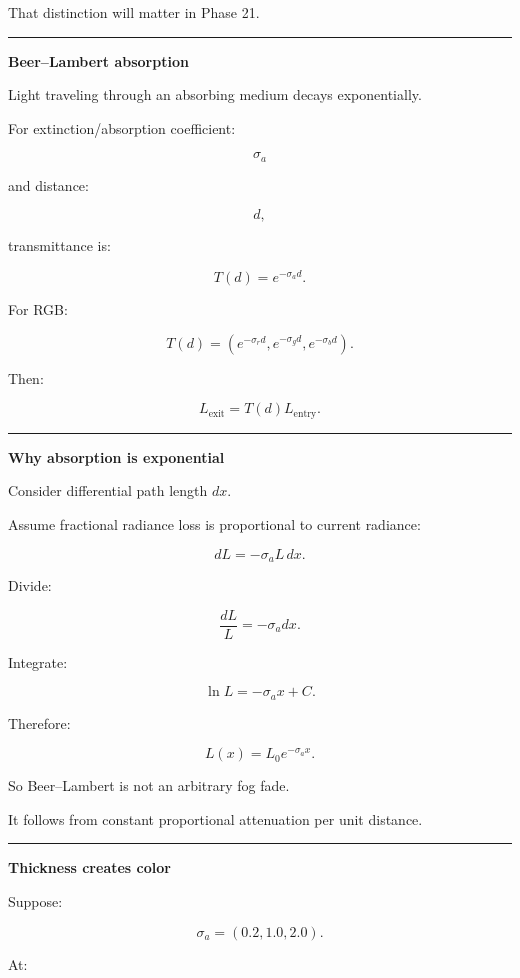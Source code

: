 That distinction will matter in Phase 21.

\begin{center}\rule{0.5\linewidth}{0.5pt}\end{center}

\textbf{Beer--Lambert absorption}

Light traveling through an absorbing medium decays exponentially.

For extinction/absorption coefficient:

\[
\sigma_a
\]

and distance:

\[
d,
\]

transmittance is:

\[
\boxed{
T(d)=e^{-\sigma_a d}.
}
\]

For RGB:

\[
\boxed{
T(d)
=
\left(
e^{-\sigma_r d},
e^{-\sigma_g d},
e^{-\sigma_b d}
\right).
}
\]

Then:

\[
L_{\text{exit}}
=
T(d)
L_{\text{entry}}.
\]

\begin{center}\rule{0.5\linewidth}{0.5pt}\end{center}

\textbf{Why absorption is exponential}

Consider differential path length \(dx\).

Assume fractional radiance loss is proportional to current radiance:

\[
dL=-\sigma_aL\,dx.
\]

Divide:

\[
\frac{dL}{L}
=
-\sigma_a dx.
\]

Integrate:

\[
\ln L
=
-\sigma_a x+C.
\]

Therefore:

\[
L(x)
=
L_0e^{-\sigma_a x}.
\]

So Beer--Lambert is not an arbitrary fog fade.

It follows from constant proportional attenuation per unit distance.

\begin{center}\rule{0.5\linewidth}{0.5pt}\end{center}

\textbf{Thickness creates color}

Suppose:

\[
\sigma_a=
(0.2,1.0,2.0).
\]

At:

